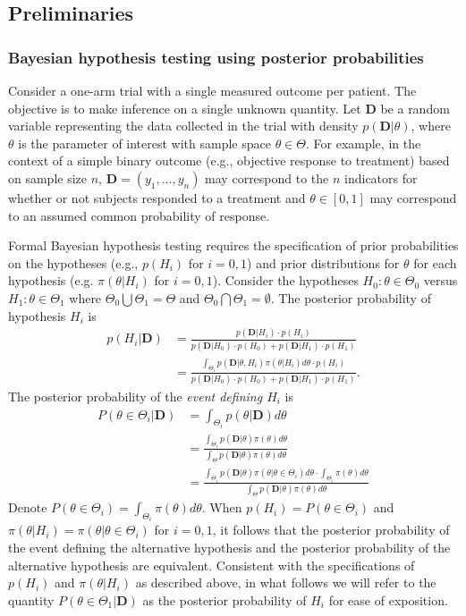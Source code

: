\documentclass[12pt]{article}
\begin{document}
\subsection{Preliminaries}\label{sec:preliminaries}
\subsubsection{Bayesian hypothesis testing using posterior probabilities}
Consider a one-arm trial with a single measured outcome per patient. The objective is to make inference on a single unknown quantity. Let $\mathbf{D}$ be a random variable representing the data collected in the trial with density $p(\mathbf{D}|\theta)$, where $\theta$ is the parameter of interest with sample space $\theta\in\Theta$. 
%
For example, in the context of a simple binary outcome (e.g., objective response to treatment) based on sample size $n$, $\mathbf{D} = \left(y_1,...,y_n\right)$ may correspond to the $n$ indicators for whether or not subjects responded to a treatment and $\theta\in[0,1]$ may correspond to an assumed common probability of response.

Formal Bayesian hypothesis testing requires the specification of prior probabilities on the hypotheses (e.g., $p(H_i)$ for $i=0,1$)
and prior distributions for $\theta$ for each hypothesis (e.g. $\pi\left(\theta \big| H_i\right)$ for $i=0,1$). 
%
Consider the hypotheses $H_0:\theta\in\Theta_{0}$ versus $H_1:\theta\in\Theta_{1}$ where $\Theta_{0}\bigcup \Theta_{1} = \Theta$ and $\Theta_{0} \bigcap \Theta_{1} = \emptyset$. The posterior probability of hypothesis $H_i$ is 
\begin{align}
p(H_i|\mathbf{D})&=\frac{p(\mathbf{D}|H_i)\cdot p(H_i)}{p(\mathbf{D}|H_0)\cdot p(H_0)+p(\mathbf{D}|H_1)\cdot p(H_1)}\\
&=\frac{\int_{\Theta_i} p(\mathbf{D}|\theta,H_i)\pi(\theta|H_i)d\theta\cdot p(H_i)}{p(\mathbf{D}|H_0)\cdot p(H_0)+p(\mathbf{D}|H_1)\cdot p(H_1)}.
\end{align}
%
The posterior probability of the \textit{event defining $H_i$} is
\begin{align}\label{eq:equation1}
P(\theta\in\Theta_i|\mathbf{D})
&=\int_{\Theta_i}p(\theta|\mathbf{D})d\theta\\
&=\frac{\int_{\Theta_i}p(\mathbf{D}|\theta)\pi (\theta)d\theta}{\int_{\Theta}p(\mathbf{D}|\theta)\pi(\theta) d\theta}\\
&=\frac{\int_{\Theta_i}p(\mathbf{D}|\theta)\pi (\theta|\theta\in\Theta_i)d\theta\cdot \int_{\Theta_i}\pi(\theta)d\theta}{\int_{\Theta}p(\mathbf{D}|\theta)\pi(\theta) d\theta}
\end{align}
Denote $P(\theta\in\Theta_i)=\int_{\Theta_i}\pi(\theta)d\theta$. When $p(H_i) =P(\theta\in\Theta_i)$ and 
$\pi\left(\theta \big| H_i\right) = \pi\left(\theta\big|\theta \in \Theta_i\right)$ for $i=0,1$,
it follows that the posterior probability of the event defining the alternative hypothesis and the posterior
probability of the alternative hypothesis are equivalent. Consistent with the specifications of $p(H_i)$ and $\pi\left(\theta \big| H_i\right)$ as described above, in what follows we will refer to 
the quantity $P(\theta\in\Theta_1|\mathbf{D})$ as the posterior probability of $H_i$ for ease of 
exposition.
\end{document}
